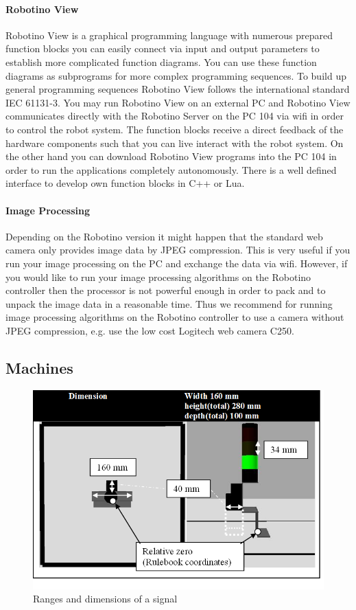 \documentclass[12pt,twoside]{article}
\begin{document}
\begin{appendix}
\paragraph{Robotino View} 

Robotino View is a graphical programming language with numerous
prepared function blocks you can easily connect via input and output
parameters to establish more complicated function diagrams. You can use
these function diagrams as subprograms for more complex programming
sequences. To build up general programming sequences Robotino View
follows the international standard IEC 61131-3. You may run Robotino
View on an external PC and Robotino View communicates directly with
the Robotino Server on the PC 104 via wifi in order to control the
robot system. The function blocks receive a direct feedback of the
hardware components such that you can live interact with the robot
system. On the other hand you can download Robotino View programs into
the PC 104 in order to run the applications completely autonomously.
There is a well defined interface to develop own function blocks in C++
or Lua.

\paragraph{Image Processing}

Depending on the Robotino version it might happen that the standard web
camera only provides image data by JPEG compression. This is very
useful if you run your image processing on the PC and exchange the data
via wifi. However, if you would like to run your image processing
algorithms on the Robotino controller then the processor is not
powerful enough in order to pack and to unpack the image data in a
reasonable time. Thus we recommend for running image processing
algorithms on the Robotino controller to use a camera without JPEG
compression, e.g. use the low cost Logitech web camera C250.

\subsection{Machines} \label{abx:sec:machine}

\begin{figure}[h]
	\centering
	\includegraphics[width=.5\textwidth]{machine_measures.png}
	\caption{Ranges and dimensions of a signal}
	\label{apx:fig:machinemeasures}
\end{figure}


\end{appendix}
\end{document}
